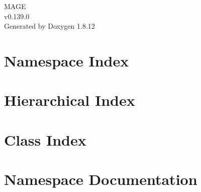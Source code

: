 \documentclass[twoside]{book}
\newcommand{\+}{\discretionary{\mbox{\scriptsize$\hookleftarrow$}}{}{}}
\newcommand{\clearemptydoublepage}{%
  \newpage{\pagestyle{empty}\cleardoublepage}%
}
\begin{document}
\hypersetup{pageanchor=false,
             bookmarksnumbered=true,
             pdfencoding=unicode
            }
\begin{titlepage}
\vspace*{7cm}
\begin{center}%
{\Large M\+A\+GE \\[1ex]\large v0.\+139.\+0 }\\
\vspace*{1cm}
{\large Generated by Doxygen 1.8.12}\\
\end{center}
\end{titlepage}
\clearemptydoublepage
{}
\tableofcontents
\clearemptydoublepage
{}
\hypersetup{pageanchor=true}

\chapter{Namespace Index}

\chapter{Hierarchical Index}

\chapter{Class Index}

\chapter{Namespace Documentation}








\end{document}
